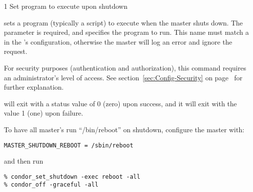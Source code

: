 \begin{ManPage}{\label{man-condor-set-shutdown}}{1}
{Set program to execute upon  shutdown}
\Synopsis {}
\ToolArgsBase

\ToolDebugOption
\ToolArgsLocate

\ToolDebugOption
\ToolWhere


\Description 

 sets a program (typically a script) to execute
when the master shuts down.  The  parameter
is required, and specifies the program to run.  This name must match a
 in the 's
configuration, otherwise the master will log an error and ignore the
request.

For security purposes (authentication and authorization),
this command requires an administrator's level of access.
See
section~\ref{sec:Config-Security} on page~\pageref{sec:Config-Security}
for further explanation.

\begin{Options}
	\ToolArgsBaseDesc
	\ToolDebugDesc
	\ToolArgsLocateDesc
\end{Options}

\ExitStatus
{} will exit with a status value of 0 (zero) upon
success, and it will exit with the value 1 (one) upon failure.


\Examples
To have all master's run ``/bin/reboot'' on shutdown, configure the
master with:
\begin{verbatim}
MASTER_SHUTDOWN_REBOOT = /sbin/reboot
\end{verbatim}
and then run
\begin{verbatim}
% condor_set_shutdown -exec reboot -all
% condor_off -graceful -all
\end{verbatim}

\end{ManPage}
